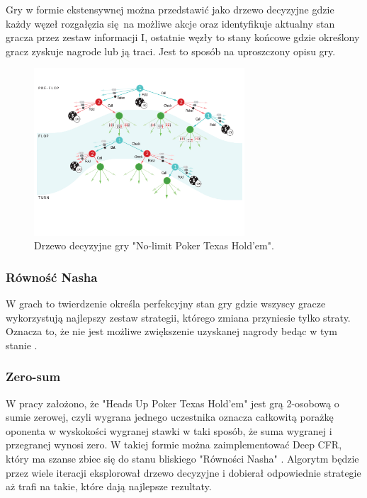 \documentclass[12pt,oneside,a4paper]{report}
\begin{document}
Gry w
formie ekstensywnej można przedstawić jako drzewo decyzyjne gdzie każdy węzeł rozgałęzia się na
możliwe akcje oraz identyfikuje aktualny stan gracza przez zestaw informacji I,
ostatnie węzły to stany końcowe gdzie określony gracz zyskuje nagrode lub ją traci. Jest to sposób
na uproszczony opisu gry.

\begin{figure}[h!]
  \centering
  \includegraphics[width=0.7\textwidth]{./img/tree1.pdf}
  \caption{Drzewo decyzyjne gry "No-limit Poker Texas Hold'em". \cite{ds}}
\end{figure}


\subsubsection{Równość Nasha}

W grach to twierdzenie określa perfekcyjny stan gry gdzie wszyscy gracze wykorzystują najlepszy
zestaw strategii, którego zmiana przyniesie tylko straty. Oznacza to, że nie jest możliwe
zwiększenie uzyskanej nagrody bedąc w tym stanie \cite{gt}.

\subsubsection{Zero-sum}

W pracy założono, że "Heads Up Poker Texas Hold'em" jest grą
2-osobową o sumie zerowej, czyli wygrana jednego
uczestnika oznacza całkowitą porażkę oponenta w wyskokości wygranej stawki w taki sposób, że suma 
wygranej i przegranej wynosi zero.
W takiej formie można
zaimplementować Deep CFR, który ma szanse zbiec się do stanu bliskiego "Równości Nasha" \cite{dcfr}.
Algorytm będzie przez wiele iteracji eksplorował drzewo decyzyjne i dobierał odpowiednie 
strategie aż trafi na takie, które dają najlepsze rezultaty.
\end{document}
